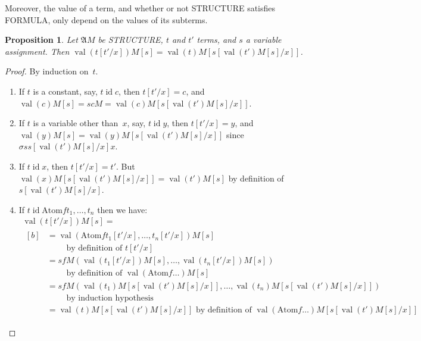 \documentclass[10pt,a4paper]{article}
\newcommand*{\olup}[1]{\MakeUppercase{#1}}
\theoremstyle{plain}
\newtheorem{prop}[thm]{Proposition}
\theoremstyle{definition}
\theoremstyle{remark}
\newcommand*{\ollabel}[1]{\label{#1}}
\providecommand{\Subst}[3]{#1[#2/#3]}
\providecommand{\Struct}{\ensuremath{\mathfrak{A}}}
\providecommand{\Assign}{\ensuremath{s}}
\providecommand{\Value}[1]{\operatorname{val}(#1)}
\providecommand{\Atom}{\mathrm{Atom}}
\providecommand{\ident}{\operatorname{id}}
\providecommand{\varAssign}{\sigma}
\begin{document}
Moreover, the value of a term, and whether or not \olup{structure}
satisfies \olup{formula}, only depend on the values of its subterms.

\begin{prop}\ollabel{prop:ext-terms}
Let $\Struct M$ be \olup{structure}, $t$ and $t'$ terms, and $s$ a
variable assignment. Then $\Value{\Subst{t}{t'}{x}}{M}[s] =
\Value{t}{M}[\Subst{s}{\Value{t'}{M}[s]}{x}]$.
\end{prop}

\begin{proof}
By induction on~$t$.
\begin{enumerate}
\item If $t$ is a constant, say, $t\ident c$, then $\Subst{t}{t'}{x} =
  c$, and $\Value{c}{M}[s] = \Assign{c}{M} =
  \Value{c}{M}[\Subst{s}{\Value{t'}{M}[s]}{x}]$.

\item If $t$ is a variable other than~$x$, say, $t \ident y$, then
  $\Subst{t}{t'}{x} = y$, and $\Value{y}{M}[s] =
  \Value{y}{M}[\Subst{s}{\Value{t'}{M}[s]}{x}]$ since
  $\varAssign{s}{\Subst{s}{\Value{t'}{M}[s]}{x}}{x}$.

\item If $t \ident x$, then $\Subst{t}{t'}{x} = t'$. But
  $\Value{x}{M}[\Subst{s}{\Value{t'}{M}[s]}{x}] = \Value{t'}{M}[s]$ by
  definition of~$\Subst{s}{\Value{t'}{M}[s]}{x}$.

\item If $t \ident \Atom{f}{t_1,\dots,t_n}$ then we have:
\begin{multline*}
  \Value{\Subst{t}{t'}{x}}{M}[s]  = \\
  \begin{aligned}[b]
& = \Value{\Atom{f}{\Subst{t_1}{t'}{x}, \dots, \Subst{t_n}{t'}{x}}}{M}[s]\\
& \qquad    \text{ by definition of $\Subst{t}{t'}{x}$}\\
& = \Assign{f}{M}(\Value{\Subst{t_1}{t'}{x}}{M}[s], \dots,
    \Value{\Subst{t_n}{t'}{x}}{M}[s])\\
    & \qquad  \text{ by definition of $\Value{\Atom{f}{\dots}}{M}[s]$}\\
& = \Assign{f}{M}(\Value{t_1}{M}[\Subst{s}{\Value{t'}{M}[s]}{x}], \dots,
   \Value{t_n}{M}[\Subst{s}{\Value{t'}{M}[s]}{x}])\\
& \qquad    \text{ by induction hypothesis}\\
& = \Value{t}{M}[\Subst{s}{\Value{t'}{M}[s]}{x}]
    \text{ by definition of $\Value{\Atom{f}{\dots}}{M}[\Subst{s}{\Value{t'}{M}[s]}{x}]$}
  \end{aligned}
\end{multline*}
\end{enumerate}
\end{proof}
\end{document}
